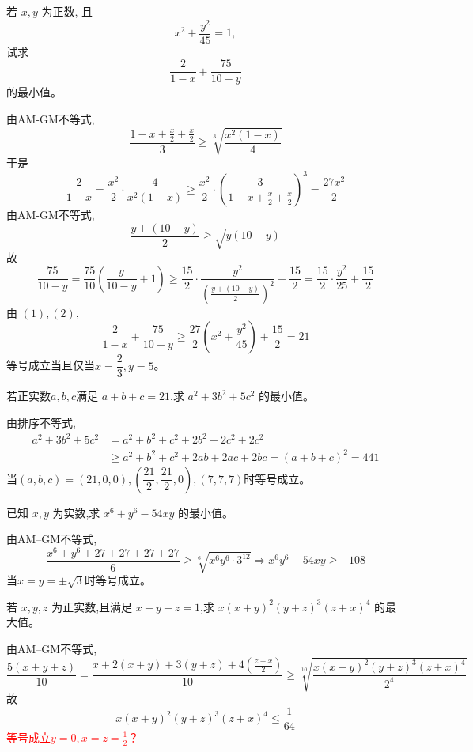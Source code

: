 \begin{questions}
    \question 若 $x,y$ 为正数, 且 
    \[
    x^2+\frac{y^2}{45}=1, 
    \]
    试求 
    \[
    \frac{2}{1-x}+\frac{75}{10-y}
    \] 
    的最小值。
    \begin{solution}
        由AM-GM不等式,
        \[
        \frac{1-x+\frac{x}{2}+\frac{x}{2}}{3} \ge \sqrt[3]{\frac{x^2(1-x)}{4}}
        \]
        于是
        \[
        \frac{2}{1-x} = \frac{x^2}{2}\cdot \frac{4}{x^2(1-x)}\ge \frac{x^2}{2}\cdot\left( \frac{3}{1-x+\frac{x}{2}+\frac{x}{2}}\right)^3 = \frac{27x^2}{2} \tag{1}
        \]
        由AM-GM不等式,
        \[
        \frac{y+(10-y)}{2} \ge \sqrt{y(10-y)}
        \]
        故
        \[
        \frac{75}{10-y}
        = \frac{75}{10}\left( \frac{y}{10-y}+1\right)
        \ge \frac{15}{2}\cdot \frac{y^2}{\left( \frac{y+(10-y)}{2}\right)^2}+\frac{15}{2}
        = \frac{15}{2}\cdot \frac{y^2}{25}+ \frac{15}{2} \tag{2}
        \]
        由 $(1),(2)$,
        \[
        \frac{2}{1-x}+\frac{75}{10-y}
        \ge \frac{27}{2}\left( x^2+\frac{y^2}{45}\right)+\frac{15}{2}= 21
        \]
        等号成立当且仅当$x=\dfrac{2}{3},y=5$。
    \end{solution}

    \question 若正实数$a,b,c$满足 $a+b+c=21$,求 $a^2+3b^2+5c^2$ 的最小值。
    \begin{solution}
        由排序不等式,
        \begin{align*}
        a^2+3b^2+5c^2 
        &= a^2+b^2+c^2 +2b^2+2c^2+2c^2 \\
        &\ge a^2+b^2+c^2 + 2ab+2ac+2bc = (a+b+c)^2 = 441
        \end{align*}
        当$(a,b,c)=(21,0,0),\left(\dfrac{21}{2},\dfrac{21}{2},0\right),(7,7,7)$时等号成立。
    \end{solution}

    \question 已知 $x,y$ 为实数,求 $x^6+y^6-54xy$ 的最小值。
    \begin{solution}
        由AM–GM不等式,
        \[
        \frac{x^6+y^6+27+27+27+27}{6} \ge \sqrt[6]{x^6y^6 \cdot 3^{12}} \Rightarrow x^6y^6 - 54xy \ge -108
        \]  
        当$x=y=\pm\sqrt{3}$时等号成立。
    \end{solution}

\question 若 $x,y,z$ 为正实数,且满足 $x+y+z=1$,求 $x(x+y)^2(y+z)^3(z+x)^4$ 的最大值。
\begin{solution}
    由AM–GM不等式,
    \[
    \frac{5(x+y+z)}{10}=\frac{x + 2(x+y) + 3(y+z) + 4\left(\frac{z+x}{2}\right)}{10} \ge \sqrt[10]{\frac{x(x+y)^2(y+z)^3(z+x)^4}{2^4}} 
    \]  
    故
    \[
    x(x+y)^2(y+z)^3(z+x)^4 \le \frac{1}{64}
    \]
    \textcolor{red}{等号成立$y=0,x=z=\frac{1}{2}$？}
\end{solution}


\end{questions}
